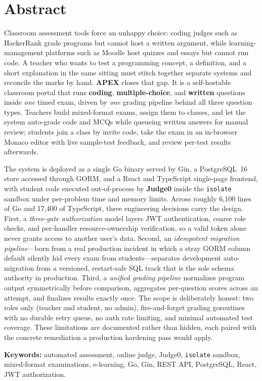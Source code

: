 \chapter*{Abstract}

Classroom assessment tools force an unhappy choice: coding judges such as HackerRank grade
programs but cannot host a written argument, while learning-management platforms such as
Moodle host quizzes and essays but cannot run code. A teacher who wants to test a
programming concept, a definition, and a short explanation in the same sitting must stitch
together separate systems and reconcile the marks by hand. \textbf{APEX} closes that gap. It
is a self-hostable classroom portal that runs \textbf{coding}, \textbf{multiple-choice}, and
\textbf{written} questions inside \emph{one} timed exam, driven by \emph{one} grading
pipeline behind all three question types. Teachers build mixed-format exams, assign them to
classes, and let the system auto-grade code and MCQs while queueing written answers for
manual review; students join a class by invite code, take the exam in an in-browser Monaco
editor with live sample-test feedback, and review per-test results afterwards.

The system is deployed as a single Go binary served by Gin, a PostgreSQL~16 store accessed
through GORM, and a React and TypeScript single-page frontend, with student code executed
out-of-process by \textbf{Judge0} inside the \texttt{isolate} sandbox under per-problem time
and memory limits. Across roughly 6{,}100 lines of Go and 17{,}400 of TypeScript, three
engineering decisions carry the design. First, a \emph{three-gate authorization} model
layers JWT authentication, coarse role checks, and per-handler resource-ownership
verification, so a valid token alone never grants access to another user's data. Second, an
\emph{idempotent migration pipeline}---born from a real production incident in which a stray
GORM column default silently hid every exam from students---separates development
auto-migration from a versioned, restart-safe SQL track that is the sole schema authority in
production. Third, a \emph{unified grading pipeline} normalizes program output symmetrically
before comparison, aggregates per-question scores across an attempt, and finalizes results
exactly once. The scope is deliberately honest: two roles only (teacher and student, no
admin), fire-and-forget grading goroutines with no durable retry queue, no auth rate
limiting, and minimal automated test coverage. These limitations are documented rather than
hidden, each paired with the concrete remediation a production hardening pass would apply.

\vspace{0.6em}
\noindent\textbf{Keywords:} automated assessment, online judge, Judge0, \texttt{isolate}
sandbox, mixed-format examinations, e-learning, Go, Gin, REST API, PostgreSQL, React, JWT
authorization.
